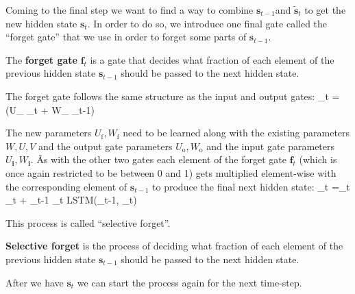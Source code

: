 
Coming to the final step we want to find a way to combine $\boldsymbol{s}_{t-1}$and $\boldsymbol{\tilde{s}}_t$ to get
the new hidden state $\boldsymbol{s}_{t}$. In order to do so, we introduce one final gate called the ``forget gate'' that we
use in order to forget some parts of $\boldsymbol{s}_{t-1}$.

The \textbf{forget gate} $\boldsymbol{f}_{t}$ is a gate that decides what fraction of each element of the previous
hidden state $\boldsymbol{s}_{t-1}$ should be passed to the next hidden state.
\ed

The forget gate follows the same structure as the input and output gates:
\bse
{}_{t} = \sigma(U_{} _{t} + W_{} _{t-1})
\ese

The new parameters $U_{\text{f}}, W_{\text{f}}$ need to be learned along with the existing parameters $W, U, V$ and
the output gate parameters $U_{\text{o}}, W_{\text{o}}$ and the input gate parameters $U_{\boldsymbol{i}},
W_{\boldsymbol{i}}$. \v

As with the other two gates each element of the forget gate $\boldsymbol{f}_{t} $ (which is once again restricted to be
between 0 and 1) gets multiplied element-wise with the corresponding element of $\boldsymbol{s}_{t-1}$ to produce the
final next hidden state:
\bse
{}_{t} =_t \odot {}_{t} + _{t-1} \odot {}_{t}
\coloneqq LSTM(_{t-1}, _{t})
\ese

This process is called ``selective forget''.

\textbf{Selective forget} is the process of deciding what fraction of each element of the previous hidden state
$\boldsymbol{s}_{t-1}$ should be passed to the next hidden state.
\ed


After we have $\boldsymbol{s}_{t} $ we can start the process again for the next time-step.


